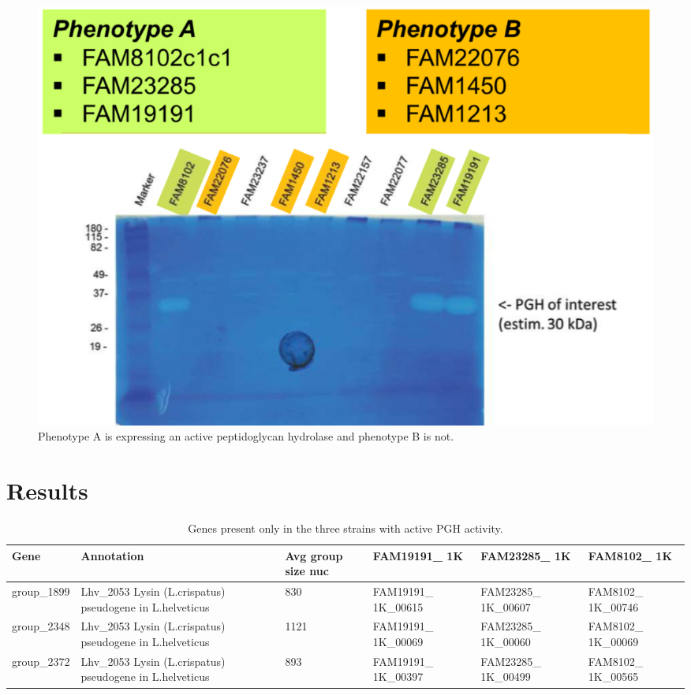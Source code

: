 \documentclass[10pt,a4paper]{article}
\begin{document}
\begin{figure}
	\centering
	\includegraphics[width=0.6\linewidth]{img/zymography}
	\caption[The two phenotypes expressed by the six strains]{Phenotype A is expressing an active peptidoglycan hydrolase and phenotype B is not.}
	\label{fig:zymography}
\end{figure}

\section*{Results}


\begin{table}[htbp]
	\centering
	\begin{tabularx}{\linewidth}{|X|X|X|X|X|X|}
		\hline
		\textbf{Gene} & \textbf{Annotation} & \textbf{Avg group size nuc} & \textbf{FAM19191\_ 1K} & \textbf{FAM23285\_ 1K} & \textbf{FAM8102\_ 1K}\\
		 \hline
		group\_1899 & Lhv\_2053 Lysin (L.crispatus) pseudogene in L.helveticus & 830 & FAM19191\_ 1K\_00615 & FAM23285\_ 1K\_00607 & FAM8102\_ 1K\_00746 \\
		\hline
		group\_2348 & Lhv\_2053 Lysin (L.crispatus) pseudogene in L.helveticus & 1121 & FAM19191\_ 1K\_00069 & FAM23285\_ 1K\_00060 & FAM8102\_ 1K\_00069 \\
		\hline
		group\_2372 & Lhv\_2053 Lysin (L.crispatus) pseudogene in L.helveticus & 893 & FAM19191\_ 1K\_00397 & FAM23285\_ 1K\_00499 & FAM8102\_ 1K\_00565 \\
		\hline	
	\end{tabularx}
	\caption{Genes present only in the three strains with active PGH activity.}
\end{table}













\newpage
{}

\end{document}
